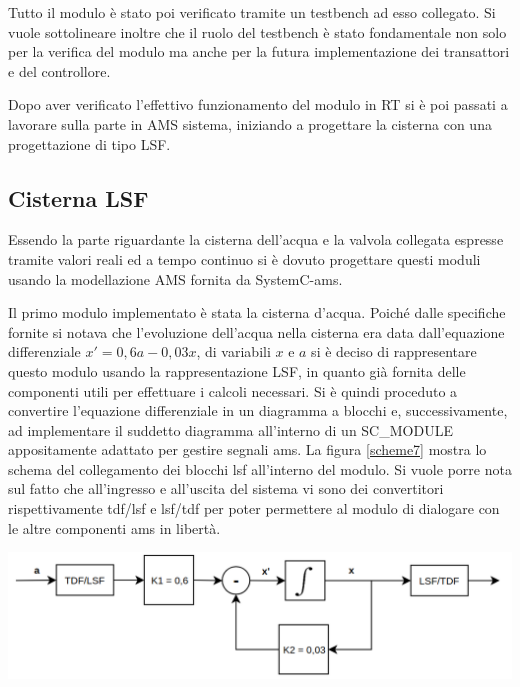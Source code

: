 \documentclass[]{IEEEtran}
\begin{document}
Tutto il modulo è stato poi verificato tramite un testbench ad esso collegato. Si vuole sottolineare inoltre che il ruolo del testbench è stato fondamentale non solo per la verifica del modulo ma anche per la futura implementazione dei transattori e del controllore.


Dopo aver verificato l'effettivo funzionamento del modulo in RT si è poi passati a lavorare sulla parte in AMS sistema, iniziando a progettare la cisterna con una progettazione di tipo LSF.

\subsection{Cisterna LSF}
Essendo la parte riguardante la cisterna dell'acqua e la valvola collegata espresse tramite valori reali ed a tempo continuo si è dovuto progettare questi moduli usando la modellazione AMS fornita da SystemC-ams.

Il primo modulo implementato è stata la cisterna d'acqua. Poiché dalle specifiche fornite si notava che l'evoluzione dell'acqua nella cisterna era data dall'equazione differenziale $ x' = 0,6a-0,03x$, di variabili $x$ e $a$ si è deciso di rappresentare questo modulo usando la rappresentazione LSF, in quanto già fornita delle componenti utili per effettuare i calcoli necessari. Si è quindi proceduto a convertire l'equazione differenziale in un diagramma a blocchi e, successivamente, ad implementare il suddetto diagramma all'interno di un SC\_MODULE appositamente adattato per gestire segnali ams. La figura \ref{scheme7} mostra lo schema del collegamento dei blocchi lsf all'interno del modulo. Si vuole porre nota sul fatto che all'ingresso e all'uscita del sistema vi sono dei convertitori rispettivamente tdf/lsf e lsf/tdf per poter permettere al modulo di dialogare con le altre componenti ams in libertà.
\begin{center}
	\includegraphics[width=\columnwidth]{Images/scheme7.png}
	\label{scheme7}
\end{center}
\end{document}
